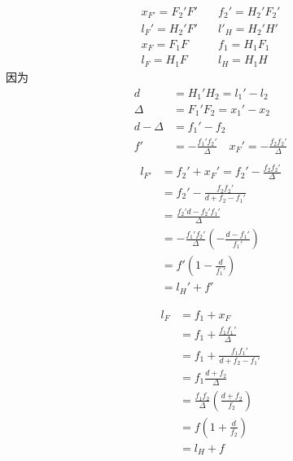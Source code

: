 \begin{align}
x_{F'}=F_2'F' &\quad f_2'=H_2'F_2' \tag{2.3.9.a} \\
l_F'=H_2'F'& \quad  l'_H=H_2'H' \tag{2.3.9.b} \\
x_{F}=F_1F &\quad f_1=H_1F_1 \tag{2.3.9.c} \\
l_F=H_1F& \quad  l_H=H_1H \tag{2.3.9.d} 
\end{align}
因为
$$
\begin{aligned}
    d&=H_1'H_2=l_1'-l_2 \\
    \Delta&=F_1'F_2=x_1'-x_2\\
    d-\Delta&=f_1'-f_2\\
    f'&=-\frac{f_1'f_2'}{\Delta} \quad x_F'=-\frac{f_2f_2'}{\Delta}\\
\end{aligned}
$$
\begin{equation}
\begin{aligned}
l_{F'}&=f_2'+x_F'=f_2'-\frac{f_2f_2'}{\Delta} \\
&=f_2'-\frac{f_2f_2'}{d+f_2-f_1'}\\
&=\frac{ f_2'd-f_2'f_1'}{\Delta}\\
&=-\frac{f_1'f_2'}{\Delta}(-\frac{d-f_1'}{f_1'})\\
&=f'(1-\frac{d}{f_1'})\\
&=l_H'+f'
\end{aligned} \tag{2.3.10}
\end{equation}

\begin{equation}
    \begin{aligned}
    l_{F}&=f_1+x_F\\
    &=f_1+\frac{f_1f_1'}{\Delta} \\
    &=f_1+\frac{f_1f_1'}{d+f_2-f_1'}\\
    &=f_1\frac{ d+f_2}{\Delta}\\
    &=\frac{f_1f_2}{\Delta}(\frac{d+f_2}{f_2})\\
    &=f(1+\frac{d}{f_2})\\
&=l_H+f
    \end{aligned} \tag{2.3.11}
    \end{equation}

